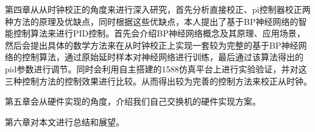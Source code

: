 第四章从从时钟校正的角度来进行深入研究，首先分析直接校正、pi控制器校正两种方法的原理及优缺点，同时根据这些优缺点，本人提出了基于BP神经网络的智能控制算法来进行PID控制。首先会介绍BP神经网络概念及其原理、应用场景，然后会提出具体的数学方法来在从时钟校正上实现一套较为完整的基于BP神经网络的控制算法，通过原始延时样本对神经网络进行训练，最后通过该算法得出的pid参数进行调节。同时会利用自主搭建的1588仿真平台上进行实验验证，并对这三种控制方法的控制效果进行比较。从而得出较为完善的控制方法来校正从时钟。

第五章会从硬件实现的角度，介绍我们自己交换机的硬件实现方案。

第六章对本文进行总结和展望。

